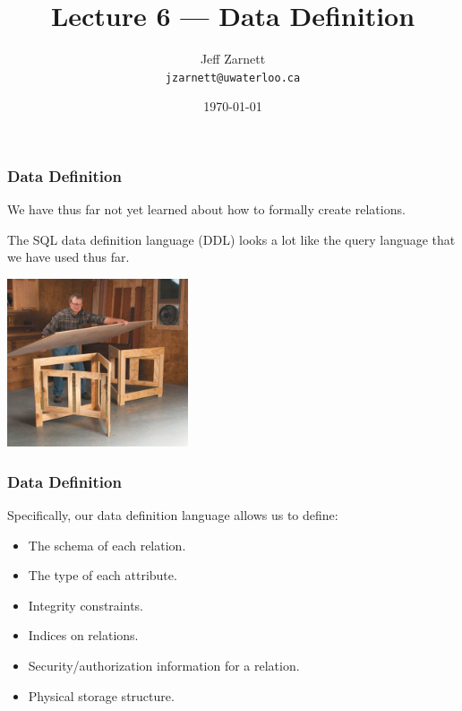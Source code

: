

\title{Lecture 6 --- Data Definition  }

\author{Jeff Zarnett \\ \small \texttt{jzarnett@uwaterloo.ca}}
\date{\today}




\begin{frame}
  \titlepage

 \end{frame}
 
 
\begin{frame}
\frametitle{Data Definition}

We have thus far not yet learned about how to formally create relations.

The SQL data definition language (DDL) looks a lot like the query language that we have used thus far.

\begin{center}
	\includegraphics[width=0.4\textwidth]{images/make-table.jpg}
\end{center}

 \end{frame}
 
 
\begin{frame}
\frametitle{Data Definition}


Specifically, our data definition language allows us to define:
\begin{itemize}
	\item The schema of each relation.
	\item The type of each attribute.
	\item Integrity constraints.
	\item Indices on relations.
	\item Security/authorization information for a relation.
	\item Physical storage structure.
\end{itemize}

\end{frame}


